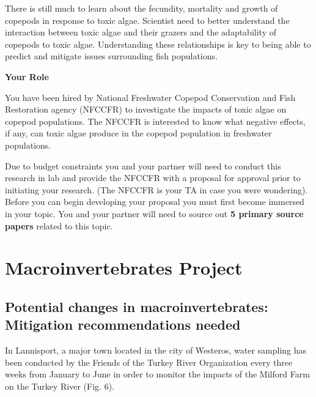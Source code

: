 \documentclass[
]{book}
\begin{document}
There is still much to learn about the fecundity, mortality and growth of copepods in response to toxic algae. Scientist need to better understand the interaction between toxic algae and their grazers and the adaptability of copepods to toxic algae. Understanding these relationships is key to being able to predict and mitigate issues surrounding fish populations.

\textbf{Your Role}

You have been hired by National Freshwater Copepod Conservation and Fish Restoration agency (NFCCFR) to investigate the impacts of toxic algae on copepod populations. The NFCCFR is interested to know what negative effects, if any, can toxic algae produce in the copepod population in freshwater populations.

Due to budget constraints you and your partner will need to conduct this research in lab and provide the NFCCFR with a proposal for approval prior to initiating your research. (The NFCCFR is your TA in case you were wondering). Before you can begin developing your proposal you must first become immersed in your topic. You and your partner will need to source out \textbf{5 primary source papers} related to this topic.

\hypertarget{macroinvertebrates-project}{%
\section*{Macroinvertebrates Project}\label{macroinvertebrates-project}}

\hypertarget{potential-changes-in-macroinvertebrates-mitigation-recommendations-needed}{%
\subsection*{Potential changes in macroinvertebrates: Mitigation recommendations needed}\label{potential-changes-in-macroinvertebrates-mitigation-recommendations-needed}}

In Lannisport, a major town located in the city of Westeros, water sampling has been conducted by the Friends of the Turkey River Organization every three weeks from January to June in order to monitor the impacts of the Milford Farm on the Turkey River (Fig. 6).
\end{document}
